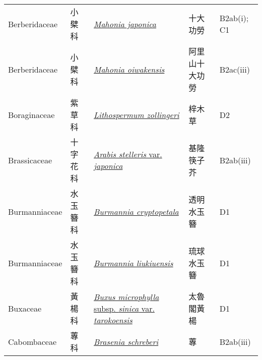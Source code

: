 {\begin{longtable}{L{2.5cm}L{2cm}L{5cm}L{2.5cm}L{3cm}}
    Berberidaceae & 小檗科 & \href{http://www.theplantlist.org/tpl1.1/search?q=Mahonia+japonica}{\textit{Mahonia japonica} } & 十大功勞 & B2ab(i); C1    \\
    Berberidaceae & 小檗科 & \href{http://www.theplantlist.org/tpl1.1/search?q=Mahonia+oiwakensis}{\textit{Mahonia oiwakensis} } & 阿里山十大功勞 & B2ac(iii)    \\
    Boraginaceae & 紫草科 & \href{http://www.theplantlist.org/tpl1.1/search?q=Lithospermum+zollingeri}{\textit{Lithospermum zollingeri} } & 梓木草 & D2    \\
    Brassicaceae & 十字花科 & \href{http://www.theplantlist.org/tpl1.1/search?q=Arabis+stelleris+var.+japonica}{\textit{Arabis stelleris} var. \textit{japonica} } & 基隆筷子芥 & B2ab(iii)    \\
    Burmanniaceae & 水玉簪科 & \href{http://www.theplantlist.org/tpl1.1/search?q=Burmannia+cryptopetala}{\textit{Burmannia cryptopetala} } & 透明水玉簪 & D1    \\
    Burmanniaceae & 水玉簪科 & \href{http://www.theplantlist.org/tpl1.1/search?q=Burmannia+liukiuensis}{\textit{Burmannia liukiuensis} } & 琉球水玉簪 & D1    \\
    Buxaceae & 黃楊科 & \href{http://www.theplantlist.org/tpl1.1/search?q=Buxus+microphylla+subsp.+sinica+var.+tarokoensis}{\textit{Buxus microphylla} subsp. \textit{sinica} var. \textit{tarokoensis} } & 太魯閣黃楊 & D1    \\
    Cabombaceae & 蓴科 & \href{http://www.theplantlist.org/tpl1.1/search?q=Brasenia+schreberi}{\textit{Brasenia schreberi} } & 蓴 & B2ab(iii)    \\

\end{longtable}}
